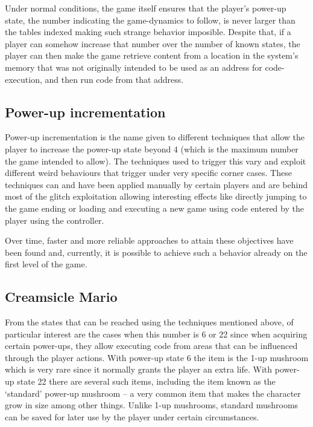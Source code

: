 \documentclass[]{article}
\begin{document}
Under normal conditions, the game itself ensures that the player's
power-up state, the number indicating the game-dynamics to follow, is
never larger than the tables indexed making such strange behavior
imposible. Despite that, if a player can somehow increase that number
over the number of known states, the player can then make the game
retrieve content from a location in the system's memory that was not
originally intended to be used as an address for code-execution, and
then run code from that address.

\hypertarget{power-up-incrementation}{%
\subsection{Power-up incrementation}\label{power-up-incrementation}}

Power-up incrementation is the name given to different techniques that
allow the player to increase the power-up state beyond 4 (which is the
maximum number the game intended to allow). The techniques used to
trigger this vary and exploit different weird behaviours that trigger
under very specific corner cases. These techniques can and have been
applied manually by certain players and are behind most of the glitch
exploitation allowing interesting effects like directly jumping to the
game ending or loading and executing a new game using code entered by
the player using the controller.

Over time, faster and more reliable approaches to attain these
objectives have been found and, currently, it is possible to achieve
such a behavior already on the first level of the game.

\hypertarget{creamsicle-mario}{%
\subsection{Creamsicle Mario}\label{creamsicle-mario}}

From the states that can be reached using the techniques mentioned
above, of particular interest are the cases when this number is 6 or 22
since when acquiring certain power-ups, they allow executing code from
areas that can be influenced through the player actions. With power-up
state 6 the item is the 1-up mushroom which is very rare since it
normally grants the player an extra life. With power-up state 22 there
are several such items, including the item known as the `standard'
power-up mushroom -- a very common item that makes the character grow in
size among other things. Unlike 1-up mushrooms, standard mushrooms can
be saved for later use by the player under certain circumstances.
\end{document}
